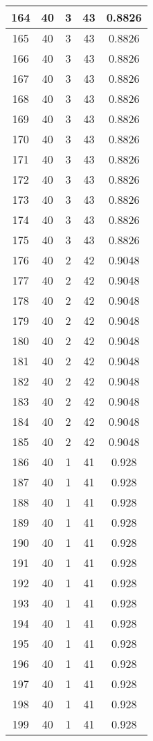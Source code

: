 \documentclass[letterpaper, 12pt]{article}
\begin{document}
\begin{longtable}{|c|c|c|c|c|}
\hline
164 & 40 & 3 & 43 & 0.8826 \\
\hline
165 & 40 & 3 & 43 & 0.8826 \\
\hline
166 & 40 & 3 & 43 & 0.8826 \\
\hline
167 & 40 & 3 & 43 & 0.8826 \\
\hline
168 & 40 & 3 & 43 & 0.8826 \\
\hline
169 & 40 & 3 & 43 & 0.8826 \\
\hline
170 & 40 & 3 & 43 & 0.8826 \\
\hline
171 & 40 & 3 & 43 & 0.8826 \\
\hline
172 & 40 & 3 & 43 & 0.8826 \\
\hline
173 & 40 & 3 & 43 & 0.8826 \\
\hline
174 & 40 & 3 & 43 & 0.8826 \\
\hline
175 & 40 & 3 & 43 & 0.8826 \\
\hline
176 & 40 & 2 & 42 & 0.9048 \\
\hline
177 & 40 & 2 & 42 & 0.9048 \\
\hline
178 & 40 & 2 & 42 & 0.9048 \\
\hline
179 & 40 & 2 & 42 & 0.9048 \\
\hline
180 & 40 & 2 & 42 & 0.9048 \\
\hline
181 & 40 & 2 & 42 & 0.9048 \\
\hline
182 & 40 & 2 & 42 & 0.9048 \\
\hline
183 & 40 & 2 & 42 & 0.9048 \\
\hline
184 & 40 & 2 & 42 & 0.9048 \\
\hline
185 & 40 & 2 & 42 & 0.9048 \\
\hline
186 & 40 & 1 & 41 & 0.928 \\
\hline
187 & 40 & 1 & 41 & 0.928 \\
\hline
188 & 40 & 1 & 41 & 0.928 \\
\hline
189 & 40 & 1 & 41 & 0.928 \\
\hline
190 & 40 & 1 & 41 & 0.928 \\
\hline
191 & 40 & 1 & 41 & 0.928 \\
\hline
192 & 40 & 1 & 41 & 0.928 \\
\hline
193 & 40 & 1 & 41 & 0.928 \\
\hline
194 & 40 & 1 & 41 & 0.928 \\
\hline
195 & 40 & 1 & 41 & 0.928 \\
\hline
196 & 40 & 1 & 41 & 0.928 \\
\hline
197 & 40 & 1 & 41 & 0.928 \\
\hline
198 & 40 & 1 & 41 & 0.928 \\
\hline
199 & 40 & 1 & 41 & 0.928 \\
\hline
\end{longtable}
\end{document}
